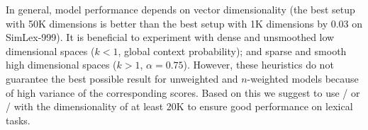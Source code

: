 \documentclass[11pt,letterpaper]{article}
\begin{document}
In general, model performance depends on vector dimensionality (the best setup with 50K dimensions is better than the best setup with 1K dimensions by 0.03 on SimLex-999). It is beneficial to experiment with dense and unsmoothed low dimensional spaces ($k < 1$, global context probability); and sparse and smooth high dimensional spaces ($k > 1$, $\alpha = 0.75$). However, these heuristics do not guarantee the best possible result for unweighted and $n$-weighted models because of high variance of the corresponding scores. Based on this we suggest to use \logNSPMI/ or \logNSCPMI/ with the dimensionality of at least 20K to ensure good performance on lexical tasks.






%
% 

\balance

\end{document}
